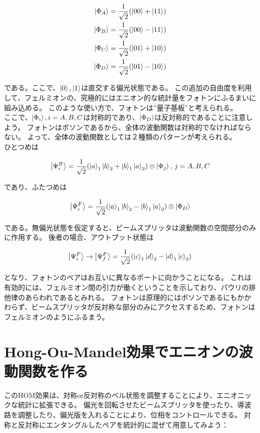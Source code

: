 \documentclass[a4paper,11pt]{jsarticle}
\numberwithin{equation}{section}
\begin{document}
\begin{align}
\ket{\Phi_A}=\frac{1}{\sqrt{2}}(\ket{00}+\ket{11})\\
\ket{\Phi_B}=\frac{1}{\sqrt{2}}(\ket{00}-\ket{11})\\
\ket{\Phi_C}=\frac{1}{\sqrt{2}}(\ket{01}+\ket{10})\\
\ket{\Phi_D}=\frac{1}{\sqrt{2}}(\ket{01}-\ket{10})\\
\end{align}

である。ここで、$\ket{0},\ket{1}$は直交する偏光状態である。
この追加の自由度を利用して、フェルミオンの、究極的にはエニオン的な統計量をフォトンにふるまいに組み込める。
このような使い方で、フォトンは”量子基板”と考えられる。\\
ここで、$\ket{\Phi_i},i=A,B,C$は対称的であり、$\ket{\Phi_D}$は反対称的であることに注意しよう。
フォトンはボソンであるから、全体の波動関数は対称的でなければならない。
よって、全体の波動関数としては２種類のパターンが考えられる。\\
ひとつめは

\begin{align}
  \ket{\Psi_i^B}=\frac{1}{\sqrt{2}}(\ket{a}_1\ket{b}_2+\ket{b}_1\ket{a}_2)\otimes\ket{\Phi_j},\,j=A,B,C
\end{align}

であり、ふたつめは

\begin{align}
  \ket{\Psi_i^F}=\frac{1}{\sqrt{2}}(\ket{a}_1\ket{b}_2-\ket{b}_1\ket{a}_2)\otimes\ket{\Phi_D}
\end{align}

である。無偏光状態を仮定すると、ビームスプリッタは波動関数の空間部分のみに作用する。
後者の場合、アウトプット状態は

\begin{align}
  \ket{\Psi_i^F}\to\ket{\Psi_f^F}=\frac{1}{\sqrt{2}}(\ket{c}_1\ket{d}_2-\ket{d}_1\ket{c}_2)
\end{align}

となり、フォトンのペアはお互いに異なるポートに向かうことになる。
これは有効的には、フェルミオン間の引力が働くということを示しており、パウリの排他律のあらわれであるとみれる。
フォトンは原理的にはボソンであるにもかかわらず、ビームスプリッタが反対称な部分のみにアクセスするため、フォトンはフェルミオンのようにふるまう。




\section{Hong-Ou-Mandel効果でエニオンの波動関数を作る}
このHOM効果は、対称or反対称のベル状態を調整することにより、エニオニックな統計に拡張できる。
偏光を回転させたビームスプリッタを使ったり、導波路を調整したり、偏光版を入れることにより、位相をコントロールできる。
対称と反対称にエンタングルしたペアを統計的に混ぜて用意してみよう：
\end{document}
